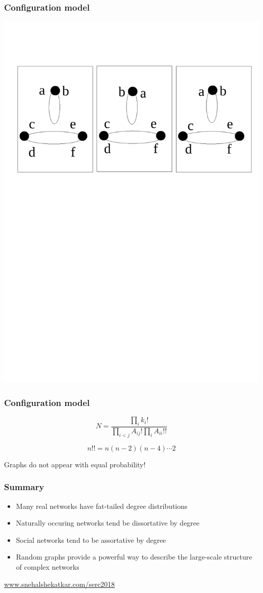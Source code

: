 \documentclass{beamer}
\begin{document}
\begin{frame}
    \frametitle{Configuration model}
    \centering
    \includegraphics[width=\columnwidth]{dumbelled.pdf}
\end{frame}
\begin{frame}
    \frametitle{Configuration model}
    \centering
    $$N = \frac{\prod_i k_i!}{\prod_{i<j}A_{ij}!\prod_i A_{ii}!!}$$

    \vspace{2em}
    $$n!! = n(n-2)(n-4)\cdots 2$$

    \vspace{2em}
    Graphs do not appear with equal probability!
\end{frame}
\begin{frame}
    \frametitle{Summary}
    \centering
    \begin{itemize}
    \setlength\itemsep{1em}
        \item{Many real networks have fat-tailed degree distributions}
        \item{Naturally occuring networks tend be dissortative by degree}
        \item{Social networks tend to be assortative by degree}
        \item{Random graphs provide a powerful way to describe the large-scale structure of complex networks}
    \end{itemize}
    \vspace{2em}
    \url{www.snehalshekatkar.com/serc2018}
\end{frame}
\end{document}
